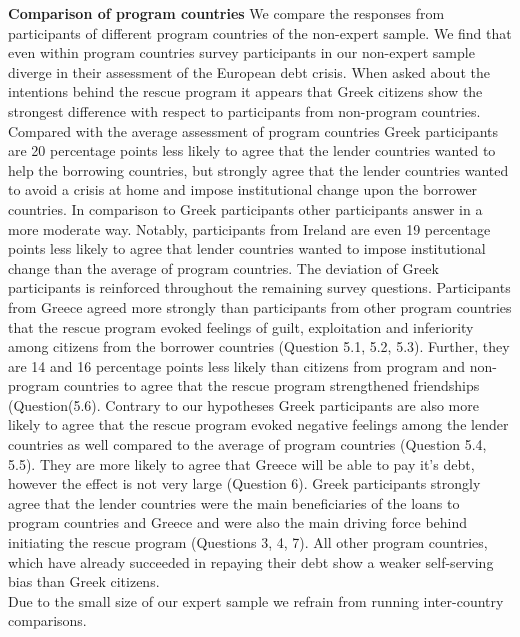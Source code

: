 \documentclass[12pt]{article}
\begin{document}
\textbf{Comparison of program countries} 
We compare the responses from participants of different program countries of the non-expert sample. We find that even within program countries survey participants in our non-expert sample diverge in their assessment of the European debt crisis. When asked about the intentions behind the rescue program it appears that Greek citizens show the strongest difference with respect to participants from non-program countries. Compared with the average assessment of program countries Greek participants are 20 percentage points less likely to agree that the lender countries wanted to help the borrowing countries, but strongly agree that the lender countries wanted to avoid a crisis at home and impose institutional change upon the borrower countries. In comparison to Greek participants other participants answer in a more moderate way. Notably, participants from Ireland are even 19 percentage points less likely to agree that lender countries wanted to impose institutional change than the average of program countries. The deviation of Greek participants is reinforced throughout the remaining survey questions. Participants from Greece agreed more strongly than participants from other program countries that the rescue program evoked feelings of guilt, exploitation and inferiority among citizens from the borrower countries (Question 5.1, 5.2, 5.3). Further, they are 14 and 16 percentage points less likely than citizens from program and non-program countries to agree that the rescue program strengthened friendships (Question(5.6). Contrary to our hypotheses Greek participants are also more likely to agree that the rescue program evoked negative feelings among the lender countries as well compared to the average of program countries (Question 5.4, 5.5).  They are more likely to agree that Greece will be able to pay it's debt, however the effect is not very large (Question 6). Greek participants strongly agree that the lender countries were the main beneficiaries of the loans to program countries and Greece and were also the main driving force behind initiating the rescue program (Questions 3, 4, 7).  All other program countries, which have already succeeded in repaying their debt show a weaker self-serving bias than Greek citizens. 
\\
Due to the small size of our expert sample we refrain from running inter-country comparisons. 
\end{document}
